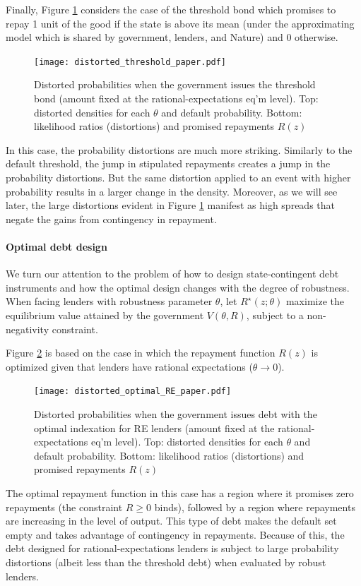 Finally, Figure \ref{Figure_distorted_threshold} considers the case of the threshold bond which promises to repay 1 unit of the good if the state is above its mean (under the approximating model which is shared by government, lenders, and Nature) and 0 otherwise. 
\begin{figure}[!hbtp]\centering
  \texttt{[image: distorted\_threshold\_paper.pdf]}
\caption{Distorted probabilities when the government issues the threshold bond (amount fixed at the rational-expectations eq'm level). Top: distorted densities for each $\theta$ and default probability. Bottom: likelihood ratios (distortions) and promised repayments $R(z)$
\label{Figure_distorted_threshold}}
\end{figure}
In this case, the probability distortions are much more striking. Similarly to the default threshold, the jump in stipulated repayments creates a jump in the probability distortions. But the same distortion applied to an event with higher probability results in a larger change in the density. Moreover, as we will see later, the large distortions evident in Figure \ref{Figure_distorted_threshold} manifest as high spreads that negate the gains from contingency in repayment.

\paragraph{Optimal debt design} We turn our attention to the problem of how to design state-contingent debt instruments and how the optimal design changes with the degree of robustness. When facing lenders with robustness parameter $\theta$, let $R^\star(z;\theta)$ maximize the equilibrium value attained by the government $V(\theta, R)$, subject to a non-negativity constraint.

Figure \ref{Figure_distorted_optimal_RE} is based on the case in which the repayment function $R(z)$ is optimized given that lenders have rational expectations ($\theta \to 0$).
\begin{figure}[!hbtp]\centering
    \texttt{[image: distorted\_optimal\_RE\_paper.pdf]}
\caption{Distorted probabilities when the government issues debt with the optimal indexation for RE lenders (amount fixed at the rational-expectations eq'm level). Top: distorted densities for each $\theta$ and default probability. Bottom: likelihood ratios (distortions) and promised repayments $R(z)$
\label{Figure_distorted_optimal_RE}}
\end{figure}
The optimal repayment function in this case has a region where it promises zero repayments (the constraint $R\geq 0$ binds), followed by a region where repayments are increasing in the level of output. This type of debt makes the default set empty and takes advantage of contingency in repayments. Because of this, the debt designed for rational-expectations lenders is subject to large probability distortions (albeit less than the threshold debt) when evaluated by robust lenders.

